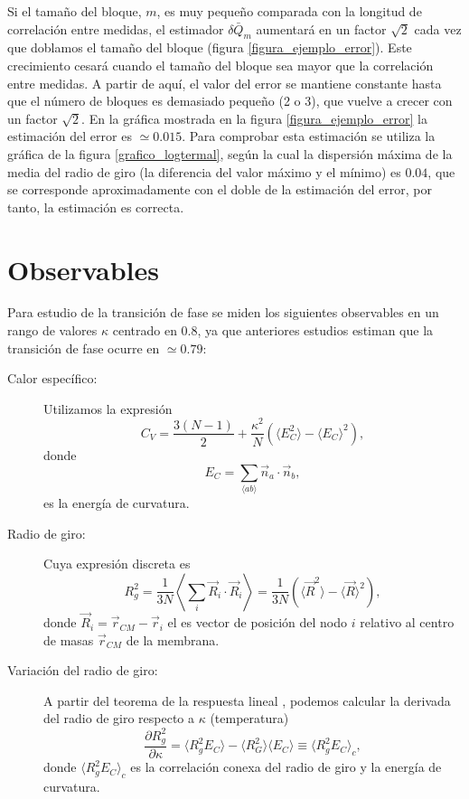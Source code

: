 Si el tamaño del bloque, $m$, es muy pequeño comparada con la longitud de
correlación entre medidas, el estimador $\delta\bar{Q}_m$ aumentará en un
factor $\sqrt{2}$ cada vez que doblamos el tamaño del bloque (figura
\ref{figura_ejemplo_error}). Este crecimiento cesará cuando el tamaño del
bloque sea mayor que la correlación entre medidas. A partir de aquí, el valor
del error se mantiene constante hasta que el número de bloques es demasiado
pequeño (2 o 3), que vuelve a crecer con un factor $\sqrt{2}$. En la gráfica
mostrada en la figura \ref{figura_ejemplo_error} la estimación del error es
$\simeq 0.015$. Para comprobar esta estimación se utiliza la gráfica de la
figura \ref{grafico_logtermal}, según la cual la
dispersión máxima de la media del radio de giro (la diferencia del valor máximo y el
mínimo) es $0.04$, que se corresponde aproximadamente con el doble de la
estimación del error, por tanto, la estimación es correcta.
\clearpage
\section{Observables}

Para estudio de la transición de fase se miden los siguientes observables en
un rango de valores $\kappa$ centrado en $0.8$, ya que anteriores estudios \cite{Bowick_flat_phase}
estiman que la transición de fase ocurre en $\simeq 0.79$:
\begin{description}
\item[Calor específico:] Utilizamos la expresión \cite{Harnish:CV}
\begin{equation}\label{CV_discreto}
 C_V=\frac{3(N-1)}{2}+\frac{\kappa^2}{N}(\langle E_C^2 \rangle-\langle E_C
\rangle^2),
\end{equation}
donde
\begin{equation*}
E_C=\sum_{\langle ab \rangle}\vec{n}_a\cdot\vec{n}_b, 
\end{equation*}
es la energía de curvatura.
\item[Radio de giro:] Cuya expresión discreta es 
\begin{equation*} 
  R_g^{2}=\frac{1}{3N}\left\langle \sum_{i}
  \vec{R}_i\cdot\vec{R}_i\right\rangle=\frac{1}{3N}(\langle\vec{R}^2 \rangle
-\langle\vec{R} \rangle^2),
\end{equation*}
donde $\vec{R}_i=\vec{r}_{CM}-\vec{r}_i $ el es vector de posición del nodo
$i$ relativo al centro de masas $\vec{r}_{CM}$ de la membrana.

\item[Variación del radio de giro:] A partir del teorema de la respuesta
  lineal \cite{Binney:critical_phenomema}, podemos calcular la derivada del
  radio de giro respecto a $\kappa$ (temperatura) 
\begin{equation*}
  \frac{\partial R_g^2}{\partial \kappa}=\langle R_g^2 E_C \rangle-\langle R_G^2\rangle\langle E_C\rangle\equiv\langle R_g^2E_C \rangle_c,
\end{equation*}
donde $\langle R_g^2E_C \rangle_c$ es la correlación conexa del radio de giro
y la energía de curvatura.
\end{description}

